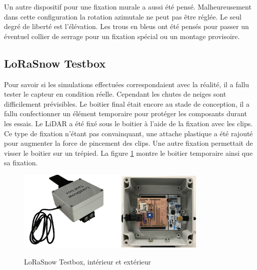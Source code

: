 Un autre dispositif pour une fixation murale a aussi été pensé. Malheureusement dans cette configuration 
la rotation azimutale ne peut pas être réglée. Le seul degré de liberté est l’élévation. Les trous en 
bleus ont été pensés pour passer un éventuel collier de serrage pour un fixation spécial ou un montage 
provisoire.

\subsection{LoRaSnow Testbox}

Pour savoir si les simulations effectuées correspondaient avec la réalité, il a fallu tester le capteur 
en condition réelle. Cependant les chutes de neiges sont difficilement prévisibles. Le boitier final était 
encore au stade de conception, il a fallu confectionner un élément temporaire pour protéger les composants 
durant les essais. Le LiDAR a été fixé sous le boitier à l'aide de la fixation avec les clips. Ce type de fixation 
n’étant pas convainquant, une attache plastique a été rajouté pour augmenter la force de pincement des clips. 
Une autre fixation permettait de visser le boitier sur un trépied. La figure \ref{fig:testbox} montre le boitier 
temporaire ainsi que sa fixation.

\begin{figure}[H]
    \centering
    \includegraphics[width=0.45\textwidth]{Images/photos_PGA/TestBox-removebg-preview.png}
    \includegraphics[width=0.35\textwidth]{Images/photos_PGA/testboxinside.jpg}
    \caption{LoRaSnow Testbox, intérieur et extérieur}
    \label{fig:testbox}
\end{figure}